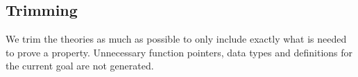 \subsection{Trimming}

We trim the theories as much as possible to only include exactly what
is needed to prove a property. Unnecessary function pointers, data
types and definitions for the current goal are not generated.

%
%
%

